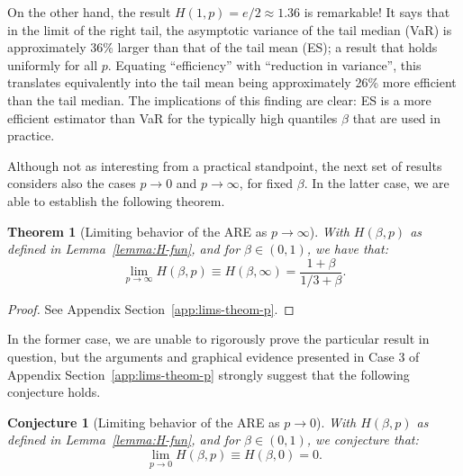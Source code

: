 \documentclass[11pt]{article}
\newcommand{\al}{\ensuremath{\beta}}
\newcommand{\cb}{\color{blue}}
\newcommand{\nc}{\normalcolor}
\newtheorem{theorem}{Theorem}%
\newtheorem{conj}{Conjecture}%
\begin{document}
On the other hand, the result $H(1,p) =e/2\approx 1.36$ is
remarkable! It says that in the limit of the right tail, the
asymptotic variance of the tail median (VaR) is approximately 36\% larger
than that of the tail mean (ES); a result that holds uniformly
for all $p$. Equating ``efficiency'' with ``reduction in
variance'', this translates equivalently into the tail mean being approximately 26\% more
efficient than the tail median. The implications of
this finding are clear: ES is a more efficient estimator than VaR
for the typically high quantiles $\al$ that are used in practice. 

Although not as interesting from a practical standpoint, \cb the next
set of results considers also the cases  $p
\rightarrow 0$ and $p \rightarrow \infty$, for fixed $\beta$. In the
latter case, we are able to establish the following theorem.

\begin{theorem}[Limiting behavior of the ARE as $p\rightarrow\infty$]\label{theom:lim-ARE-p}
With  $H(\beta,p)$ as defined in Lemma~\ref{lemma:H-fun}, and for $\beta \in (0,
  1)$, we have that:
\[
\lim_{p \rightarrow \infty} H(\beta,p) \equiv H(\beta,\infty) =\frac{1+\beta}{1/3+\beta}.
\]  
\end{theorem} 
\begin{proof}
See Appendix Section~\ref{app:lims-theom-p}.
\end{proof}

In the former case, we are unable to rigorously prove the particular
result in question, but the arguments and graphical evidence presented in Case 3
of Appendix Section~\ref{app:lims-theom-p} strongly suggest that the
following conjecture holds.
\begin{conj}[Limiting behavior of the ARE as $p\rightarrow 0$]\label{conj:lim-ARE-p}
With  $H(\beta,p)$ as defined in Lemma~\ref{lemma:H-fun}, and for $\beta \in (0,
  1)$, we conjecture that:
\[
\lim_{p \rightarrow 0} H(\beta,p) \equiv H(\beta,0) =0.
\]  
\end{conj} 
\nc
\end{document}
